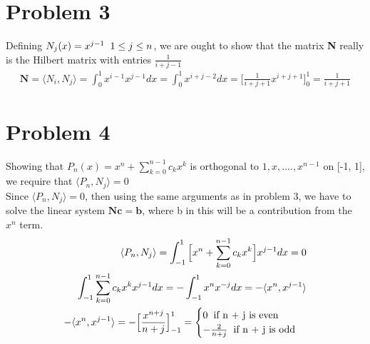 \documentclass[a4paper,norsk]{article}
\begin{document}
\section*{Problem 3}
Defining $N_j(x) = x^{j-1} \hspace{2mm} 1 \leq j \leq n$, we are ought to show that the matrix \textbf{N} really is the Hilbert matrix with entries $\frac{1}{i + j - 1}$
\begin{align}
\mathbf{N} = \langle N_i, N_j \rangle = \int_0^1 x^{i - 1} x^{j - 1} dx = \int_0^1 x^{i + j- 2} dx = \Big[\frac{1}{i+j+1} x^{i+j+1} \Big]_0^1 = \frac{1}{i+j+1} 
\end{align}

\section*{Problem 4}
Showing that $P_n(x) = x^n + \sum_{k=0}^{n-1} c_k x^k$ is orthogonal to $1, x, ...., x^{n-1}$ on [-1, 1], we require that $\langle P_n,  N_j\rangle = 0$ \\
Since $\langle P_n,  N_j\rangle = 0$, then using the same arguments as in problem 3, we have to solve the linear system $\mathbf{Nc = b}$, where b in this will be a contribution from the $x^n$ term.
\begin{align}
\langle P_n,  N_j\rangle = \int_{-1}^1  \Big[x^n + \sum_{k=0}^{n-1} c_k x^k\Big]x^{j-1} dx = 0 \\
 \int_{-1}^1 \sum_{k=0}^{n-1} c_k x^k x^{j-1} dx = -\int_{-1}^1  x^n x^{-j} dx = -\langle x^n, x^{j-1}\rangle \\
 -\langle x^n, x^{j-1}\rangle = -\Big[\frac{x^{n+j} }{n+j} \Big]_{-1}^1  = 
 \begin{cases} 
      0 \hspace{2mm} \text{if n + j is even } \\
      -\frac{2}{n+j} \hspace{2mm} \text{if n + j is odd}
   \end{cases}
\end{align}
\end{document}
